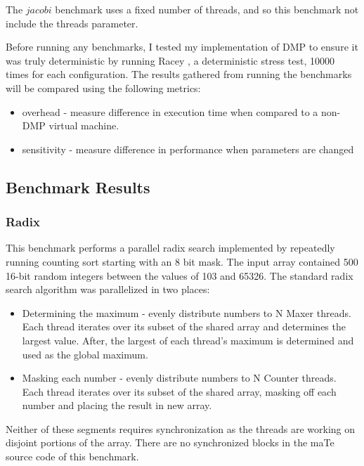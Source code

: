 The $jacobi$ benchmark uses a fixed number of threads, and so this
benchmark not include the threads parameter.

Before running any benchmarks, I tested my implementation of DMP to
ensure it was truly deterministic by running Racey \cite{racey}, a
deterministic stress test, 10000 times for each configuration.  The
results gathered from running the benchmarks will be compared using
the following metrics:

\begin{itemize}
\item overhead - measure difference in execution time when compared to
  a non-DMP virtual machine.

\item sensitivity - measure difference in performance when parameters
  are changed
\end{itemize}

\subsection{Benchmark Results}

\subsubsection{Radix}

This benchmark performs a parallel radix search implemented by
repeatedly running counting sort starting with an 8 bit mask.  The
input array contained 500 16-bit random integers between the values of
103 and 65326.  The standard radix search algorithm was parallelized
in two places:

\begin{itemize}
\item Determining the maximum - evenly distribute numbers to N Maxer
  threads.  Each thread iterates over its subset of the shared array
  and determines the largest value.  After, the largest of each
  thread's maximum is determined and used as the global maximum.

\item Masking each number - evenly distribute numbers to N Counter
  threads.  Each thread iterates over its subset of the shared array,
  masking off each number and placing the result in new array.
\end{itemize}

Neither of these segments requires synchronization as the threads are
working on disjoint portions of the array.  There are no synchronized
blocks in the maTe source code of this benchmark.

